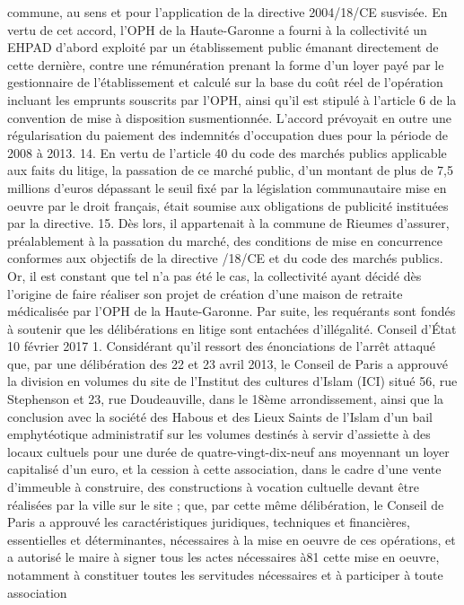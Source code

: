 \documentclass[11pt,a4paper]{report}
\begin{document}
commune, au sens et pour l'application de la directive 2004/18/CE susvisée. En vertu de cet accord, l'OPH de la
Haute-Garonne a fourni à la collectivité un EHPAD d'abord exploité par un établissement public émanant
directement de cette dernière, contre une rémunération prenant la forme d'un loyer payé par le gestionnaire de
l'établissement et calculé sur la base du coût réel de l'opération incluant les emprunts souscrits par l'OPH, ainsi
qu'il est stipulé à l'article 6 de la convention de mise à disposition susmentionnée. L'accord prévoyait en outre
une régularisation du paiement des indemnités d'occupation dues pour la période de 2008 à 2013.
14. En vertu de l'article 40 du code des marchés publics applicable aux faits du litige, la passation de ce marché
public, d'un montant de plus de 7,5 millions d'euros dépassant le seuil fixé par la législation communautaire
mise en oeuvre par le droit français, était soumise aux obligations de publicité instituées par la directive.
15. Dès lors, il appartenait à la commune de Rieumes d'assurer, préalablement à la passation du marché, des
conditions de mise en concurrence conformes aux objectifs de la directive /18/CE et du code des
marchés publics. Or, il est constant que tel n'a pas été le cas, la collectivité ayant décidé dès l'origine de faire
réaliser son projet de création d'une maison de retraite médicalisée par l'OPH de la Haute-Garonne. Par suite,
les requérants sont fondés à soutenir que les délibérations en litige sont entachées d'illégalité.
Conseil d'État 10 février 2017 
1. Considérant qu'il ressort des énonciations de l'arrêt attaqué que, par une délibération des 22 et 23 avril 2013,
le Conseil de Paris a approuvé la division en volumes du site de l'Institut des cultures d'Islam (ICI) situé 56, rue
Stephenson et 23, rue Doudeauville, dans le 18ème arrondissement, ainsi que la conclusion avec la société des
Habous et des Lieux Saints de l'Islam d'un bail emphytéotique administratif sur les volumes destinés à servir
d'assiette à des locaux cultuels pour une durée de quatre-vingt-dix-neuf ans moyennant un loyer capitalisé d'un
euro, et la cession à cette association, dans le cadre d'une vente d'immeuble à construire, des constructions à
vocation cultuelle devant être réalisées par la ville sur le site ; que, par cette même délibération, le Conseil de
Paris a approuvé les caractéristiques juridiques, techniques et financières, essentielles et déterminantes,
nécessaires à la mise en oeuvre de ces opérations, et a autorisé le maire à signer tous les actes nécessaires à81
cette mise en oeuvre, notamment à constituer toutes les servitudes nécessaires et à participer à toute association
\end{document}
